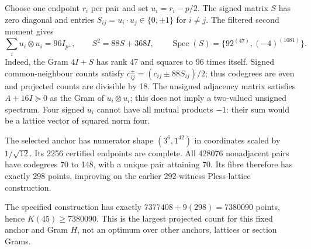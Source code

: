 Choose one endpoint $r_i$ per pair and set $u_i=r_i-p/2$.
The signed matrix $S$ has zero diagonal and entries
$S_{ij}=u_i\cdot u_j\in\{0,\pm1\}$ for $i\ne j$. The filtered
second moment gives
\[
\sum_i u_i\otimes u_i=96I_{p^\perp},\qquad
S^2=88S+368I,\qquad
\operatorname{Spec}(S)=\{92^{(47)},(-4)^{(1081)}\}.
\]
Indeed, the Gram $4I+S$ has rank 47 and squares to 96 times itself.
Signed common-neighbour counts satisfy
$c_{ij}^{\pm}=(c_{ij}\pm88S_{ij})/2$; thus codegrees are even and
projected counts are divisible by 18.
The unsigned adjacency matrix satisfies $A+16I\succeq0$ as the Gram
of $u_i\otimes u_i$; this does not imply a two-valued unsigned spectrum.
Four signed $u_i$ cannot have all mutual products $-1$: their sum
would be a lattice vector of squared norm four.

The selected anchor has numerator shape $(3^6,1^{42})$ in coordinates
scaled by $1/\sqrt{12}$. Its 2256 certified endpoints are complete.
All 428076 nonadjacent pairs have codegrees 70 to 148, with a unique
pair attaining 70. Its fibre therefore has exactly 298 points,
improving on the earlier 292-witness Pless-lattice construction.

\begin{corollary}\label{cor:section45}
The specified construction has exactly
$7377408+9(298)=7380090$ points, hence $K(45)\ge7380090$.
This is the largest projected count for this fixed anchor and Gram
$H$, not an optimum over other anchors, lattices or section Grams.
\end{corollary}
